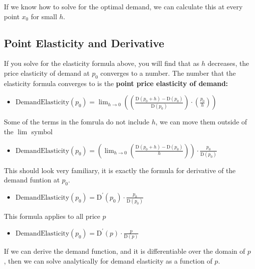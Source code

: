 \documentclass[
]{book}
\providecommand{\tightlist}{%
  \setlength{\itemsep}{0pt}\setlength{\parskip}{0pt}}
\begin{document}
If we know how to solve for the optimal demand, we can calculate this at
every point \(x_0\) for small \(h\).

\hypertarget{point-elasticity-and-derivative}{%
\subsection{Point Elasticity and Derivative}\label{point-elasticity-and-derivative}}

If you solve for the elasticity formula above, you will find that as \(h\)
decreases, the price elasticity of demand at \(p_0\) converges to a
number. The number that the elasticity formula converges to is the
\textbf{point price elasticity of demand:}

\begin{itemize}
\tightlist
\item
  \(\displaystyle \textrm{DemandElasticity}(p_0 )=\lim_{h\to 0} \left(\left(\frac{\textrm{D}(p_0 +h)-\textrm{D}(p_0 )}{\textrm{D}(p_0 )}\right)\cdot \left(\frac{p_0 }{h}\right)\right)\)
\end{itemize}

Some of the terms in the fomrula do not include \(h\), we can move them
outside of the \(\lim\) symbol

\begin{itemize}
\tightlist
\item
  \(\displaystyle \textrm{DemandElasticity}(p_0 )=\left(\lim_{h\to 0} \left(\frac{\textrm{D}(p_0 +h)-\textrm{D}(p_0 )}{h}\right)\right)\cdot \frac{p_0 }{\textrm{D}(p_0 )}\)
\end{itemize}

This should look very familiary, it is exactly the formula for
derivative of the demand funtion at \(p_0\).

\begin{itemize}
\tightlist
\item
  \(\displaystyle \textrm{DemandElasticity}(p_0 )={\textrm{D}}^{\prime } (p_0 )\cdot \frac{p_0 }{\textrm{D}(p_0 )}\)
\end{itemize}

This formula applies to all price \(p\)

\begin{itemize}
\tightlist
\item
  \(\displaystyle \textrm{DemandElasticity}(p_0 )={\textrm{D}}^{\prime } (p)\cdot \frac{p}{\textrm{D}(p)}\)
\end{itemize}

If we can derive the demand function, and it is differentiable over the
domain of \(p\), then we can solve analytically for demand elasticity as a
function of \(p\).
\end{document}
